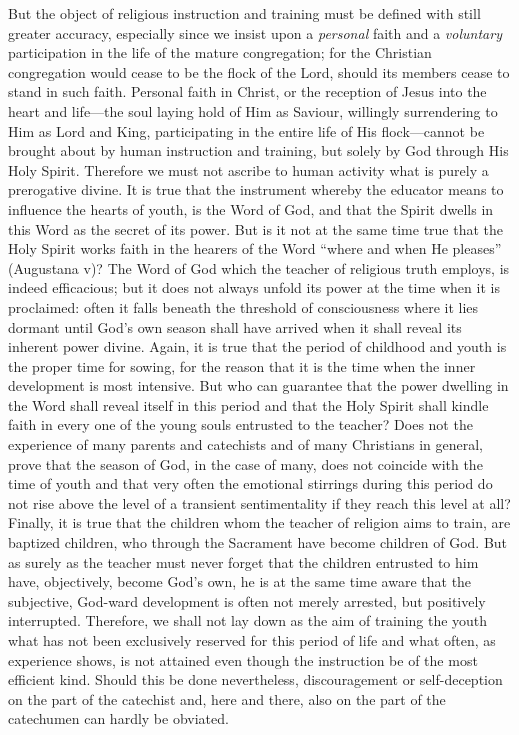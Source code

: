 But the object of religious instruction and training must
be defined with still greater accuracy, especially since we insist upon a \emph{personal} faith and a \emph{voluntary} participation in the life of the mature congregation; for the Christian congregation would cease to be the flock of the Lord, should its members cease to stand in such faith. Personal faith in Christ, or the reception of Jesus into the heart and life—the soul laying hold of Him as Saviour, willingly surrendering to Him as Lord and King, participating in the entire life of His flock—cannot be brought about by human instruction and training, but solely by God through His Holy Spirit. Therefore we must not ascribe to human activity what is purely a prerogative divine. It is true that the instrument whereby the educator means to influence the hearts of youth, is the Word of God, and that the Spirit dwells in this Word as the secret of its power. But is it not at the same time true that the Holy Spirit works faith in the hearers of the Word “where and when He pleases” (Augustana v)? The Word of God which the teacher of religious truth employs, is indeed efficacious; but it does not always unfold its power at the time when it is proclaimed: often it falls beneath the threshold of consciousness where it lies dormant until God’s own season shall have arrived when it shall reveal its inherent power divine. Again, it is true that the period of childhood and youth is the proper time for sowing, for the reason that it is the time when the inner development is most intensive. But who can guarantee that the power dwelling in the Word shall reveal itself in this period and that the Holy Spirit shall kindle faith in every one of the young souls entrusted to the teacher? Does not the experience of many parents and catechists and of many Christians in general, prove that the season of God, in the case of many, does not coincide with the time of youth and that very often the emotional stirrings during this period do not rise above the level of a transient sentimentality
if they reach this level at all? Finally, it is true that the children whom the teacher of religion aims to train, are baptized children, who through the Sacrament have become children of God. But as surely as the teacher must never forget that the children entrusted to him have, objectively, become God’s own, he is at the same time aware that the subjective, God-ward development is often not merely arrested, but positively interrupted. Therefore, we shall not lay down as the aim of training the youth what has not been exclusively reserved for this period of life and what often, as experience shows, is not attained even though the instruction be of the most efficient kind. Should this be done nevertheless, discouragement or self-deception on the part of the catechist and, here and there, also on the part of the catechumen can hardly be obviated.

